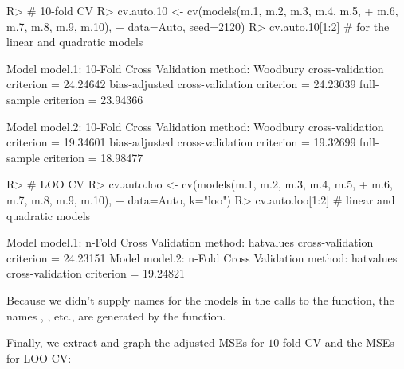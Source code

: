 \documentclass[
]{jss}
\begin{document}
\begin{CodeChunk}
\begin{CodeInput}
R> # 10-fold CV
R> cv.auto.10 <- cv(models(m.1, m.2, m.3, m.4, m.5,
+                      m.6, m.7, m.8, m.9, m.10),
+               data=Auto, seed=2120)
R> cv.auto.10[1:2] # for the linear and quadratic models
\end{CodeInput}
\begin{CodeOutput}

Model model.1:
10-Fold Cross Validation
method: Woodbury
cross-validation criterion = 24.24642
bias-adjusted cross-validation criterion = 24.23039
full-sample criterion = 23.94366 

Model model.2:
10-Fold Cross Validation
method: Woodbury
cross-validation criterion = 19.34601
bias-adjusted cross-validation criterion = 19.32699
full-sample criterion = 18.98477 
\end{CodeOutput}
\begin{CodeInput}
R> # LOO CV
R> cv.auto.loo <- cv(models(m.1, m.2, m.3, m.4, m.5,
+                         m.6, m.7, m.8, m.9, m.10),
+                  data=Auto, k="loo")
R> cv.auto.loo[1:2] # linear and quadratic models
\end{CodeInput}
\begin{CodeOutput}

Model model.1:
n-Fold Cross Validation
method: hatvalues
cross-validation criterion = 24.23151
Model model.2:
n-Fold Cross Validation
method: hatvalues
cross-validation criterion = 19.24821
\end{CodeOutput}
\end{CodeChunk}

Because we didn't supply names for the models in the calls to the
 function, the names , ,
etc., are generated by the function.

Finally, we extract and graph the adjusted MSEs for \(10\)-fold CV and
the MSEs for LOO CV:
\end{document}

